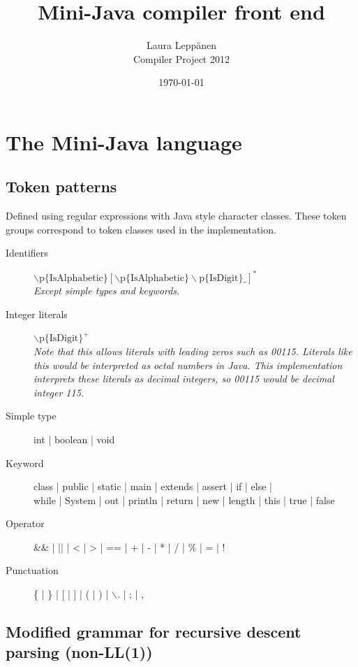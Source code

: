 \documentclass[a4paper,11pt]{article}
\begin{document}
\title{Mini-Java compiler front end}
\author{Laura Leppänen \\ Compiler Project 2012}
\date{\today}
\maketitle
\thispagestyle{empty}

\tableofcontents
\onehalfspacing

\newpage
\setcounter{page}{1}

\section{The Mini-Java language}

\subsection{Token patterns}

Defined using regular expressions with Java style character classes. These token groups correspond to token classes used in the implementation.

\begin{description}
\item[Identifiers] $\backslash\text{p\{IsAlphabetic\}} [ \backslash\text{p\{IsAlphabetic\}}\backslash\text{p\{IsDigit\}\_ } ]^{*}$ \\ \emph{Except simple types and keywords.}
\item[Integer literals] $\backslash\text{p\{IsDigit\}}^{+}$ \\ \emph{Note that this allows literals with leading zeros such as 00115. Literals like this would be interpreted as octal numbers in Java. This implementation interprets these literals as decimal integers, so 00115 would be decimal integer 115.}
\item[Simple type] int | boolean | void
\item[Keyword] class | public | static | main | extends | assert | if | else | \\ while | System | out | println | return | new | length | this | true | false
\item[Operator] \&\& | || | < | > | == | + | - | *  | / | \% | = | !
\item[Punctuation] \{ | \} | [ | ] | ( | ) | $\backslash$. | ; | ,
\end{description}

\subsection{Modified grammar for recursive descent parsing (non-LL(1))}
\end{document}
